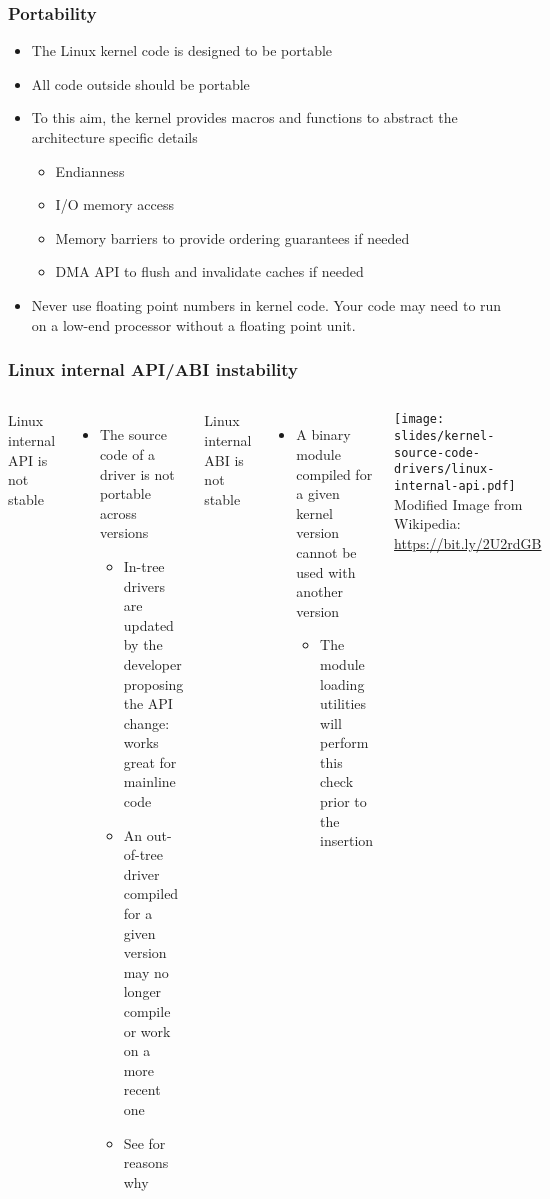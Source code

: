\begin{frame}
  \frametitle{Portability}
  \begin{itemize}
  \item The Linux kernel code is designed to be portable
  \item All code outside  should be portable
  \item To this aim, the kernel provides macros and functions to
    abstract the architecture specific details
    \begin{itemize}
    \item Endianness
    \item I/O memory access
    \item Memory barriers to provide ordering guarantees if needed
    \item DMA API to flush and invalidate caches if needed
    \end{itemize}
  \item Never use floating point numbers in kernel code. Your code may
    need to run on a low-end processor without a floating point unit.
  \end{itemize}
\end{frame}

\begin{frame}
  \frametitle{Linux internal API/ABI instability}
  \begin{columns}
    Linux internal API is not stable
    \begin{itemize}
    \item The source code of a driver is not portable across versions
      \begin{itemize}
      \item In-tree drivers are updated by the developer proposing the API
        change: works great for mainline code
      \item An out-of-tree driver compiled for a given version may no
        longer compile or work on a more recent one
      \item See  for reasons why
      \end{itemize}
    \end{itemize}
    Linux internal ABI is not stable
    \begin{itemize}
    \item A binary module compiled for a given kernel version cannot be
      used with another version
      \begin{itemize}
      \item The module loading utilities will perform this check prior
        to the insertion
      \end{itemize}
    \end{itemize}
    \texttt{[image: slides/kernel-source-code-drivers/linux-internal-api.pdf]}
    \tiny
    Modified Image from Wikipedia:\\
    \url{https://bit.ly/2U2rdGB}
  \end{columns}
\end{frame}

